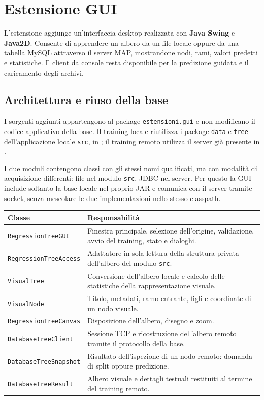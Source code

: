 \clearpage
\section*{Estensione GUI}

L'estensione aggiunge un'interfaccia desktop realizzata con \textbf{Java Swing}
e \textbf{Java2D}. Consente di apprendere un albero da un file locale oppure da
una tabella MySQL attraverso il server MAP, mostrandone nodi, rami, valori
predetti e statistiche. Il client da console resta disponibile per la
predizione guidata e il caricamento degli archivi.

\subsection*{Architettura e riuso della base}

I sorgenti aggiunti appartengono al package \texttt{estensioni.gui} e non
modificano il codice applicativo della base. Il training locale riutilizza i
package \texttt{data} e \texttt{tree} dell'applicazione locale \texttt{src}, in
; il training remoto utilizza il server già presente in
.

I due moduli contengono classi con gli stessi nomi qualificati, ma con modalità
di acquisizione differenti: file nel modulo \texttt{src}, JDBC nel server.
Per questo la GUI include soltanto la base locale nel proprio JAR e
comunica con il server tramite socket, senza mescolare le due implementazioni
nello stesso classpath.

\begin{center}
\begin{tabularx}{\textwidth}{@{}lX@{}}
\toprule
\textbf{Classe} & \textbf{Responsabilità} \\
\midrule
\texttt{RegressionTreeGUI} & Finestra principale, selezione dell'origine,
validazione, avvio del training, stato e dialoghi. \\
\texttt{RegressionTreeAccess} & Adattatore in sola lettura della struttura
privata dell'albero del modulo \texttt{src}. \\
\texttt{VisualTree} & Conversione dell'albero locale e calcolo delle
statistiche della rappresentazione visuale. \\
\texttt{VisualNode} & Titolo, metadati, ramo entrante, figli e coordinate
di un nodo visuale. \\
\texttt{RegressionTreeCanvas} & Disposizione dell'albero, disegno e zoom. \\
\texttt{DatabaseTreeClient} & Sessione TCP e ricostruzione dell'albero remoto
tramite il protocollo della base. \\
\texttt{DatabaseTreeSnapshot} & Risultato dell'ispezione di un nodo remoto:
domanda di split oppure predizione. \\
\texttt{DatabaseTreeResult} & Albero visuale e dettagli testuali restituiti
al termine del training remoto. \\
\bottomrule
\end{tabularx}
\end{center}


